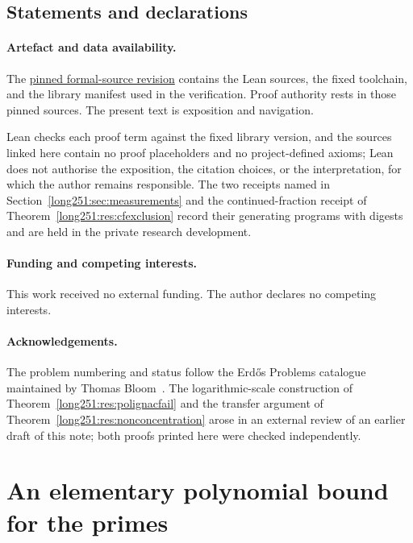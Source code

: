 \documentclass[11pt]{article}
\begin{document}
\subsection*{Statements and declarations}

\paragraph{Artefact and data availability.} The
\href{\sourceurl}{pinned formal-source revision} contains the Lean sources, the
fixed toolchain, and the library manifest used in the verification.  Proof
authority rests in those pinned sources.  The present text is exposition and
navigation.

Lean checks each proof term against the fixed library version, and the sources
linked here contain no proof placeholders and no project-defined axioms; Lean
does not authorise the exposition, the citation choices, or the
interpretation, for which the author remains responsible.  The two receipts
named in Section~\ref{long251:sec:measurements} and the continued-fraction receipt of
Theorem~\ref{long251:res:cfexclusion} record their generating programs with digests
and are held in the private research development.

\paragraph{Funding and competing interests.} This work received no external
funding.  The author declares no competing interests.

\paragraph{Acknowledgements.} The problem numbering and status follow the
Erd\H{o}s Problems catalogue maintained by Thomas Bloom~\cite{erdosproblems}.
The logarithmic-scale construction of Theorem~\ref{long251:res:polignacfail} and the
transfer argument of Theorem~\ref{long251:res:nonconcentration} arose in an external
review of an earlier draft of this note; both proofs printed here were checked
independently.

\appendix
\section{An elementary polynomial bound for the primes}\label{long251:app:prime-bound}
\end{document}
